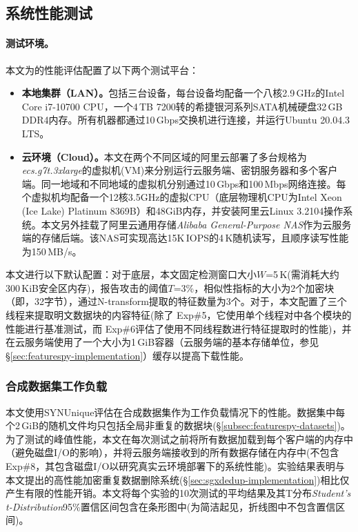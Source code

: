 \subsection{系统性能测试}
\label{subsec:featurespy-evaluation-performance}

\paragraph*{测试环境。} 本文为\prototype 的性能评估配置了以下两个测试平台：

\begin{itemize}[leftmargin=*]
    \item {\bf 本地集群（LAN）。}包括三台设备，每台设备均配备一个八核2.9\,GHz的Intel Core i7-10700 CPU，一个4\,TB 7200转的希捷银河系列SATA机械硬盘32\,GB DDR4内存。所有机器都通过10\,Gbps交换机进行连接，并运行Ubuntu 20.04.3 LTS。
    \item {\bf 云环境（Cloud）。}本文在两个不同区域的阿里云\cite{Alibaba}部署了多台规格为{\em ecs.g7t.3xlarge}的虚拟机(VM)来分别运行云服务端、密钥服务器和多个客户端。同一地域和不同地域的虚拟机分别通过10\,Gbps和100\,Mbps网络连接。每个虚拟机均配备一个12核3.5GHz的虚拟CPU（底层物理机CPU为Intel Xeon (Ice Lake) Platinum 8369B）和48GiB内存，并安装阿里云Linux 3.2104操作系统。本文另外挂载了阿里云通用存储{\em Alibaba General-Purpose NAS}作为云服务端的存储后端。该NAS可实现高达15K\,IOPS的4\,K随机读写，且顺序读写性能为150\,MB/s。
\end{itemize}

本文进行以下默认配置：对于底层\sysnameF，本文固定检测窗口大小$W$=5\,K(需消耗大约300\,KiB安全区内存)，报告攻击的阈值$T$=3\%，相似性指标的大小为2个加密块（即，32字节），通过N-transform提取的特征数量为3个。对于\prototype，本文配置了三个线程来提取明文数据块的内容特征(除了 Exp\#5，它使用单个线程对\prototype 中各个模块的性能进行基准测试，而 Exp\#6评估了\prototype 使用不同线程数进行特征提取时的性能)，并在云服务端使用了一个大小为1\,GiB容器（云服务端的基本存储单位，参见\S\ref{sec:featurespy-implementation}）缓存以提高下载性能。

\subsubsection{合成数据集工作负载}
\label{subsec:featurespy-syn}
本文使用SYNUnique评估\prototype 在合成数据集作为工作负载情况下的性能。数据集中每个2\,GiB的随机文件均只包括全局非重复的数据块(\S\ref{subsec:featurespy-datasets})。为了测试\prototype 的峰值性能，本文在每次测试之前将所有数据加载到每个客户端的内存中（避免磁盘I/O的影响），并将云服务端接收到的所有数据存储在内存中(不包含Exp\#8，其包含磁盘I/O以研究真实云环境部署下的系统性能)。实验结果表明\prototype 与本文提出的高性能加密重复数据删除系统\sysnameS (\S\ref{sec:sgxdedup-implementation})相比仅产生有限的性能开销。本文将每个实验的10次测试的平均结果及其T分布{\em Student's t-Distribution}95\%置信区间包含在条形图中(为简洁起见，折线图中不包含置信区间)。

